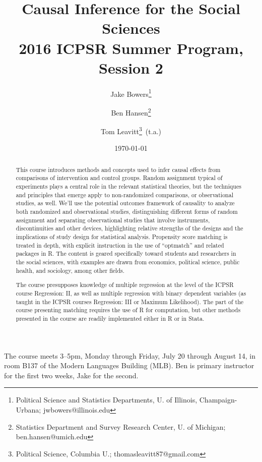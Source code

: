 \documentclass[12pt]{article}
\title{Causal Inference for the Social Sciences\\2016 ICPSR Summer
  Program, Session 2 
}
\author{ Jake Bowers\thanks{ Political Science and Statistics
    Departments, U. of Illinois, Champaign-Urbana; jwbowers@illinois.edu}
\and Ben Hansen\thanks{Statistics Department and Survey Research
  Center, U. of Michigan; ben.hansen@umich.edu} \and Tom
Leavitt\thanks{Political Science, Columbia U.; \mbox{thomasleavitt87@gmail.com}}\,  (t.a.)}
\date{\today}
\begin{document}
\maketitle
\begin{abstract}
This course introduces methods and concepts used to infer causal
effects from comparisons of intervention and control groups.  Random
assignment typical of experiments plays a central role in the relevant statistical theories,
but the techniques and principles that emerge apply to non-randomized
comparisons, or observational studies, as well. We'll use the potential outcomes framework of
causality to analyze both randomized and observational studies,
distinguishing different forms of random assignment and separating
observational studies that involve instruments, discontinuities and
other devices, highlighting relative strengths of the designs and the
implications of study design for statistical analysis. Propensity
score matching is treated in depth, with explicit instruction in the
use of ``optmatch'' and related packages in R.  The content is geared specifically toward students and researchers in the social sciences, with examples are drawn from economics, political science, public health, and sociology, among other fields.

The course presupposes knowledge of multiple regression at the level
of the ICPSR course Regression: II, as well as multiple regression
with binary dependent variables (as taught in the ICPSR courses
Regression: III or Maximum Likelihood).  The part of the course presenting
matching requires the use of R for computation, but other methods presented in
the course are readily implemented either in R or in Stata.
\end{abstract}


The course meets 3--5pm, Monday through Friday, July 20 through August
14,  in room B137 of the Modern Languages
  Building (MLB).
Ben is primary instructor for the first
two weeks, Jake for the second.  
\end{document}
